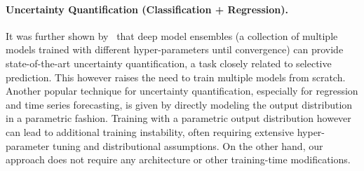 
\paragraph{Uncertainty Quantification (Classification + Regression).} 
It was further shown by~\citep{balaji2017uncertainty, zaoui2020regression} that deep model ensembles (\ie a collection of multiple models trained with different hyper-parameters until convergence) can provide state-of-the-art uncertainty quantification, a task closely related to selective prediction. This however raises the need to train multiple models from scratch. %
Another popular technique for uncertainty quantification, especially for regression and time series forecasting, is given by directly modeling the output distribution~\citep{alexandrov2019gluonts} in a parametric fashion. Training with a parametric output distribution however can lead to additional training instability, often requiring extensive hyper-parameter tuning and distributional assumptions. On the other hand, our approach does not require any architecture or other training-time modifications. 


